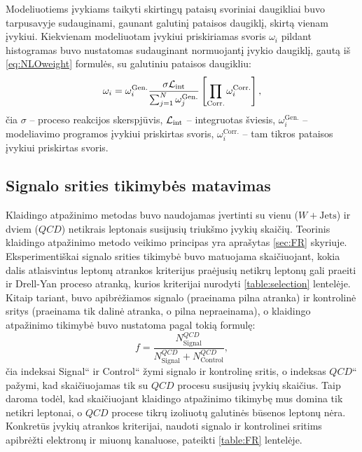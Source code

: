 \documentclass[a4paper, 12pt, oneside]{article}
\newcommand{\WJets}{W\! +\!\mathrm{Jets}}
\newcommand{\ltq}[1]{{\quotedblbase{}#1\textquotedblleft{}}}
\newcommand{\Lumi}{{\cal L}_\mathrm{int}}
\newcommand{\QCD}{QC\! D}
\newlength\q
\begin{document}
Modeliuotiems įvykiams taikyti skirtingų pataisų svoriniai daugikliai buvo tarpusavyje sudauginami, gaunant galutinį pataisos
daugiklį, skirtą vienam įvykiui.
Kiekvienam modeliuotam įvykiui priskiriamas svoris $\omega_i$ pildant histogramas buvo nustatomas sudauginant normuojantį įvykio daugiklį,
gautą iš \eqref{eq:NLOweight} formulės, su galutiniu pataisos daugikliu:
\begin{equation}
\label{eq:weightCorr}
	\omega_i = \omega_{i}^{\mathrm{Gen.}} \frac{ \sigma\Lumi }{ \sum_{j=1}^{N}\omega_{j}^{\mathrm{Gen.}} }
			   \left[ \prod_{\mathrm{Corr.}} \omega_i^{\mathrm{Corr.}} \right] ,
\end{equation}
čia $\sigma$ -- proceso reakcijos skerspjūvis, $\Lumi$ -- integruotas šviesis, $\omega_{i}^{\mathrm{Gen.}}$ -- modeliavimo
programos įvykiui priskirtas svoris, $\omega_i^{\mathrm{Corr.}}$ -- tam tikros pataisos įvykiui priskirtas svoris.

\subsection{Signalo srities tikimybės matavimas}\label{sec:FRmeasure}
Klaidingo atpažinimo metodas buvo naudojamas įvertinti su vienu ($\WJets$) ir dviem ($\QCD$) netikrais leptonais
susijusių triukšmo įvykių skaičių.
Teorinis klaidingo atpažinimo metodo veikimo principas yra aprašytas \ref{sec:FR} skyriuje.
Eksperimentiškai signalo srities tikimybė buvo matuojama skaičiuojant, kokia dalis atlaisvintus leptonų atrankos
kriterijus praėjusių netikrų leptonų gali praeiti ir Drell-Yan proceso atranką, kurios kriterijai nurodyti
\ref{table:selection} lentelėje.
Kitaip tariant, buvo apibrėžiamos signalo (praeinama pilna atranka) ir kontrolinė sritys (praeinama tik dalinė
atranka, o pilna nepraeinama), o klaidingo atpažinimo tikimybė buvo nustatoma pagal tokią formulę:
\begin{equation}
	\label{eq:FRexp}
	f = \frac{N_{\mathrm{Signal}}^{\QCD}}{N_{\mathrm{Signal}}^{\QCD}+N_{\mathrm{Control}}^{\QCD}},
\end{equation}
čia indeksai \ltq{Signal} ir \ltq{Control} žymi signalo ir kontrolinę sritis, o indeksas \ltq{$\QCD$} pažymi, kad
skaičiuojamas tik su $\QCD$ procesu susijusių įvykių skaičius.
Taip daroma todėl, kad skaičiuojant klaidingo atpažinimo tikimybę mus domina tik netikri leptonai,
o $\QCD$ procese tikrų izoliuotų galutinės būsenos leptonų nėra.
Konkretūs įvykių atrankos kriterijai, naudoti signalo ir kontrolinei sritims apibrėžti elektronų ir miuonų kanaluose,
pateikti \ref{table:FR} lentelėje.
\end{document}
